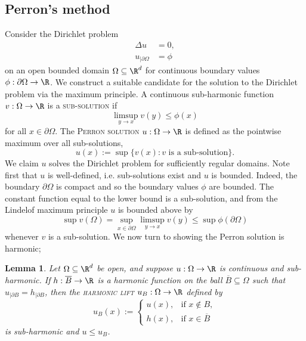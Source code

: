 \documentclass[reqno]{amsart}
\newtheorem{lemma}[theorem]{Lemma}
\theoremstyle{definition}
\theoremstyle{remark}
\newcounter{problem}[section]	\declaretheorem[style=thmrecbox,name=Problem, numberlike=problem]{statement}
\renewcommand{\emph}{\textsc}
\begin{document}
\subsection{Perron's method}

Consider the Dirichlet problem
	\begin{align*}
		\Delta u
			&= 0, \\
		u_{|\partial \Omega} 
			&= \phi	
	\end{align*}
on an open bounded domain $\Omega \subseteq \R^d$ for continuous boundary values $\phi : \partial \Omega \to \R$. We construct a suitable candidate for the solution to the Dirichlet problem via the maximum principle. A continuous sub-harmonic function $v : \Omega \to \R$ is a \emph{sub-solution} if 
	\[ \limsup_{y \to x} v(y) \leq \phi(x) \]
for all $x \in \partial \Omega$. The \emph{Perron solution} $u: \Omega \to \R$ is defined as the pointwise maximum over all sub-solutions, 
	\[ u (x) := \sup\{ v(x) : \text{$v$ is a sub-solution} \}. \]
We claim $u$ solves the Dirichlet problem for sufficiently regular domains. Note first that $u$ is well-defined, i.e. sub-solutions exist and $u$ is bounded. Indeed, the boundary $\partial \Omega$ is compact and so the boundary values $\phi$ are bounded. The constant function equal to the lower bound is a sub-solution, and from the Lindelof maximum principle $u$ is bounded above by 
	\[ \sup v(\Omega) = \sup_{x \in \partial \Omega} \limsup_{y \to x} v(y) \leq \sup \phi(\partial \Omega) \]
whenever $v$ is a sub-solution. We now turn to showing the Perron solution is harmonic;

\begin{lemma}
	Let $\Omega \subseteq \R^d$ be open, and suppose $u: \Omega \to \R$ is continuous and sub-harmonic. If $h : \overline B \to \R$ is a harmonic function on the ball $\overline B \subseteq \Omega$ such that $u_{|\partial B} = h_{|\partial B}$, then the \emph{harmonic lift} $u_B : \Omega \to \R$ defined by
		\[ u_B (x)
			:=
			\begin{cases}
				u(x), 		&\text{if }x \not\in B, \\
				h(x), 		&\text{if }x \in \overline B 
			\end{cases}
		 \]
	is sub-harmonic and $u \leq u_B$.  
\end{lemma}
\end{document}

